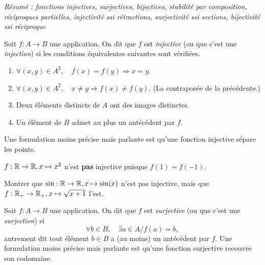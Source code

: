 \emph{Résumé : fonctions injectives, surjectives, bijectives, stabilité par composition, réciproques partielles, injectivité ssi rétractions, surjectivité ssi  sections, bijectivité ssi réciproque}



\begin{definition}
Soit $f : A \to B$ une application. On dit que $f$ est \emph{injective} (ou que c'est une \emph{injection}) si les conditions équivalentes suivantes sont vérifiées.
\begin{enumerate}
\item $\forall (x,y) \in A^2,\quad f(x)=f(y) \Rightarrow  x=y$.
\item $\forall (x,y) \in A^2,\quad x\neq y \Rightarrow  f(x)\neq f(y)$. (La contraposée de la précédente.)
\item Deux éléments distincts de $A$ ont des images distinctes. 
\item Un élément de $B$ admet au plus un antécédent par $f$.
\end{enumerate}
Une formulation moins précise mais parlante est qu'une fonction injective \og sépare les points\fg{}.
\end{definition}

\begin{exemple}
$f : \mathbb{R}\to \mathbb{R}, x\mapsto x^2$ n'est \textbf{pas} injective puisque $f(1)=f(-1)$.
\end{exemple}


\begin{exercice}
Montrer que  $\sin : \mathbb{R}\to \mathbb{R}, x\mapsto \sin(x)$ n'est pas injective, mais que $f:\mathbb{R}_+\to \mathbb{R}_+, x\mapsto \sqrt{x+1}$ l'est.
\end{exercice}



\begin{definition}
Soit $f : A \to B$ une application. On dit que $f$ est \emph{surjective} (ou que c'est une \emph{surjection}) si
\[\forall b \in B,\quad \exists a\in A / f(a)=b,\]
autrement dit tout élément $b\in B$ a (au moins) un antécédent par $f$.
Une formulation moins précise mais parlante est  qu'une fonction surjective \og recouvre son codomaine\fg{}.
\end{definition}

